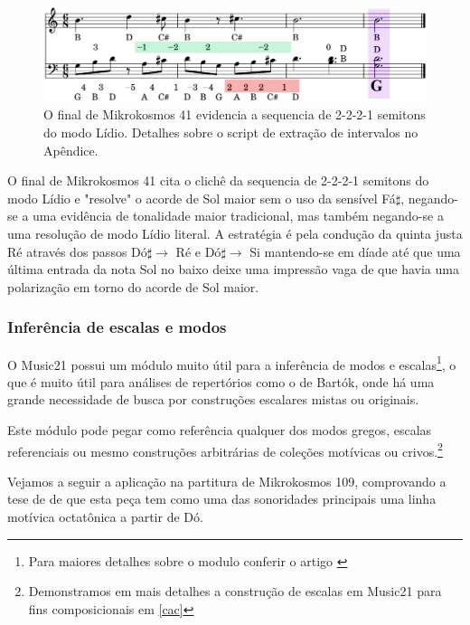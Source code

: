 \documentclass[
	12pt,				%
	openright,			%
	twoside,			%
	a4paper,			%
	english,			%
	french,				%
	spanish,			%
	brazil				%
	]{abntex2}
\begin{document}
\begin{figure}[!h]
	\caption{\label{fig_grafico}O final de Mikrokosmos 41 evidencia a sequencia de 2-2-2-1 semitons do modo Lídio. Detalhes sobre o script de extração de intervalos no Apêndice. } 
	\begin{center}
	    \includegraphics[scale=0.3]{estudosM21/mikro041FinalChords_contorno.png}
	\end{center}
\end{figure}

O final de Mikrokosmos 41 cita o clichê da sequencia de 2-2-2-1 semitons do modo Lídio e "resolve" o acorde de Sol maior sem o uso da sensível Fá$\sharp$, negando-se a uma evidência de tonalidade maior tradicional, mas também negando-se a uma resolução de modo Lídio literal. A estratégia é pela condução da quinta justa Ré através dos passos Dó$\sharp \rightarrow $ Ré e Dó$\sharp \rightarrow $ Si mantendo-se em díade até que uma última entrada da nota Sol no baixo deixe uma impressão vaga de que havia uma polarização em torno do acorde de Sol maior. 

\subsubsection{Inferência de escalas e modos}

O Music21 possui um módulo muito útil para a inferência de modos e escalas\footnote{Para maiores detalhes sobre o modulo conferir o artigo \cite{ariza2011analytical}}, o que é muito útil para análises de repertórios como o de Bartók, onde há uma grande necessidade de busca por construções escalares mistas ou originais.

Este módulo pode pegar como referência qualquer dos modos gregos, escalas referenciais ou mesmo construções arbitrárias de coleções motívicas ou crivos.\footnote{Demonstramos em mais detalhes a construção de escalas em Music21 para fins composicionais em \autoref{cac} }

Vejamos a seguir a aplicação na partitura de Mikrokosmos 109, comprovando a tese de  de que esta peça tem como uma das sonoridades principais uma linha motívica octatônica a partir de Dó.
\end{document}
